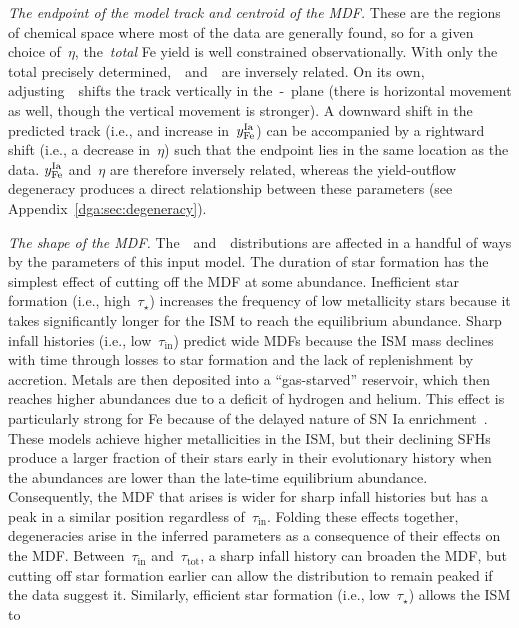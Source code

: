 \textit{The endpoint of the model track and centroid of the MDF.}
These are the regions of chemical space where most of the
data are generally found, so for a given choice of~$\eta$, the~\textit{total}
Fe yield is well constrained observationally.
With only the total precisely determined,~\yfecc~and~\yfeia~are inversely
related.
On its own, adjusting~\yfeia~shifts the track vertically in the~\afe-\feh~plane
(there is horizontal movement as well, though the vertical movement is
stronger).
A downward shift in the predicted track (i.e., and increase in~$y_\text{Fe}^\text{Ia}$) can be
accompanied by a rightward shift (i.e., a decrease in~$\eta$) such that the
endpoint lies in the same location as the data.
$y_\text{Fe}^\text{Ia}$ and~$\eta$ are therefore inversely related, whereas the yield-outflow
degeneracy produces a direct relationship between these parameters
(see Appendix~\ref{dga:sec:degeneracy}).
\par
\textit{The shape of the MDF.}
The~\afe~and~\feh~distributions are affected in a handful of ways by the
parameters of this input model.
The duration of star formation has the simplest effect of cutting off the MDF
at some abundance.
Inefficient star formation (i.e., high~$\tau_\star$) increases the frequency of
low metallicity stars because it takes significantly longer for the ISM to
reach the equilibrium abundance.
Sharp infall histories (i.e., low~$\tau_\text{in}$) predict wide MDFs because
the ISM mass declines with time through losses to star formation and the lack
of replenishment by accretion.
Metals are then deposited into a ``gas-starved'' reservoir, which then reaches
higher abundances due to a deficit of hydrogen and helium.
This effect is particularly strong for Fe because of the delayed nature of SN
Ia enrichment~\citep{Weinberg2017b}.
These models achieve higher metallicities in the ISM, but their declining SFHs
produce a larger fraction of their stars early in their evolutionary history
when the abundances are lower than the late-time equilibrium abundance.
Consequently, the MDF that arises is wider for sharp infall histories but has
a peak in a similar position regardless of~$\tau_\text{in}$.
Folding these effects together, degeneracies arise in the inferred parameters
as a consequence of their effects on the MDF.
Between~$\tau_\text{in}$ and~$\tau_\text{tot}$, a sharp infall history can
broaden the MDF, but cutting off star formation earlier can allow the
distribution to remain peaked if the data suggest it.
Similarly, efficient star formation (i.e., low~$\tau_\star$) allows the ISM to
